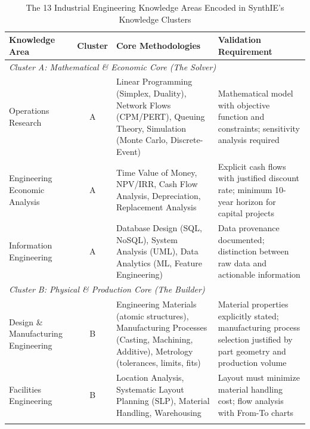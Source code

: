 
\begin{table}[h]
\centering
\caption{The 13 Industrial Engineering Knowledge Areas Encoded in SynthIE's Knowledge Clusters}
\label{tab:knowledge_areas}
\small
\begin{tabular}{@{}p{3.5cm}cp{4cm}p{5cm}@{}}
\toprule
\textbf{Knowledge Area} & \textbf{Cluster} & \textbf{Core Methodologies} & \textbf{Validation Requirement} \\ \midrule

\multicolumn{4}{l}{\textit{Cluster A: Mathematical \& Economic Core (The Solver)}} \\
\midrule

Operations Research & A & Linear Programming (Simplex, Duality), Network Flows (CPM/PERT), Queuing Theory, Simulation (Monte Carlo, Discrete-Event) & Mathematical model with objective function and constraints; sensitivity analysis required \\
\addlinespace

Engineering Economic Analysis & A & Time Value of Money, NPV/IRR, Cash Flow Analysis, Depreciation, Replacement Analysis & Explicit cash flows with justified discount rate; minimum 10-year horizon for capital projects \\
\addlinespace

Information Engineering & A & Database Design (SQL, NoSQL), System Analysis (UML), Data Analytics (ML, Feature Engineering) & Data provenance documented; distinction between raw data and actionable information \\
\midrule

\multicolumn{4}{l}{\textit{Cluster B: Physical \& Production Core (The Builder)}} \\
\midrule

Design \& Manufacturing Engineering & B & Engineering Materials (atomic structures), Manufacturing Processes (Casting, Machining, Additive), Metrology (tolerances, limits, fits) & Material properties explicitly stated; manufacturing process selection justified by part geometry and production volume \\
\addlinespace

Facilities Engineering & B & Location Analysis, Systematic Layout Planning (SLP), Material Handling, Warehousing & Layout must minimize material handling cost; flow analysis with From-To charts \\
\addlinespace


\end{tabular}
\end{table}
